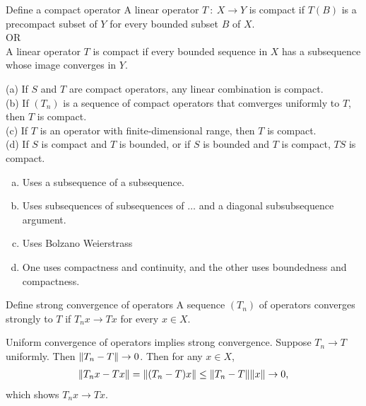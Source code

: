 \documentclass[avery5388,grid,frame]{flashcards}
\begin{document}
\begin{flashcard}
    {Define a compact operator}
    A linear operator $T\ :\ X \rightarrow Y$ is compact if $T(B)$ is a precompact subset of $Y$ for every bounded subset $B$ of $X$. \\

    OR \\

    A linear operator $T$ is compact if every bounded sequence in $X$ has a subsequence whose image converges in $Y$.
\end{flashcard}

\begin{flashcard}
    {(a) If $S$ and $T$ are compact operators, any linear combination is compact.  \\ (b) If $(T_n)$ is a sequence of compact operators that comverges uniformly to $T$, then $T$ is compact.  \\ (c) If $T$ is an operator with finite-dimensional range, then $T$ is compact. \\ (d) If $S$ is compact and $T$ is bounded, or if $S$ is bounded and $T$ is compact, $TS$ is compact.}
    \begin{enumerate}[(a)]
        \item Uses a subsequence of a subsequence.
        \item Uses subsequences of subsequences of $\dots$ and a diagonal subsubsequence argument.
        \item Uses Bolzano Weierstrass
        \item One uses compactness and continuity, and the other uses boundedness and compactness.
    \end{enumerate}
\end{flashcard}

\begin{flashcard}
    {Define strong convergence of operators}
    A sequence $(T_n)$ of operators converges strongly to $T$ if $T_nx \rightarrow Tx$ for every $x \in X$.
\end{flashcard}

\begin{flashcard}
    {Uniform convergence of operators implies strong convergence.}
    Suppose $T_n \rightarrow T$ uniformly.  Then $\norm{T_n - T} \rightarrow 0$.  Then for any $x \in X$, 
    \begin{align*}
        \norm{T_n x - T x} = \norm{(T_n - T)x} \leq \norm{T_n - T}\norm{x} \rightarrow 0,
    \end{align*}
    which shows $T_nx \rightarrow Tx$.
\end{flashcard}
\end{document}
